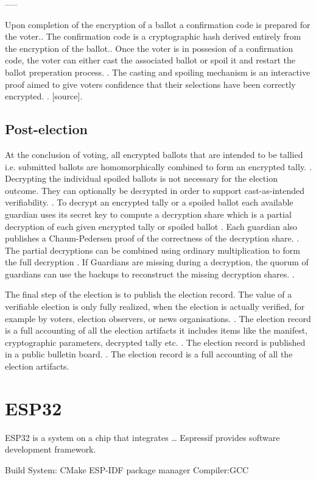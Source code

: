 -----

Upon completion of the encryption of a ballot a confirmation code is prepared for the voter.\cite[17]{eg-spec}. The confirmation code is a cryptographic hash derived entirely from the encryption of the ballot.\cite[14]{eg-paper}. Once the voter is in possesion of a confirmation code, the voter can either cast the associated ballot or spoil it and restart the ballot preperation process. \cite[17]{eg-spec}. The casting and spoiling mechanism is an interactive proof aimed to give voters confidence that their selections have been correctly encrypted. \cite{eg-docs}. [source].

\subsection{Post-election}
At the conclusion of voting, all encrypted ballots that are intended to be tallied i.e. submitted ballots are homomorphically combined to form an encrypted tally. \cite[5]{eg-spec} \cite[18]{eg-spec} \cite[15]{eg-paper}. Decrypting the individual spoiled ballots is not necessary for the election outcome. They can optionally be decrypted in order to support cast-as-intended verifiability. \cite[17]{eg-paper}. To decrypt an encrypted tally or a spoiled ballot each available guardian uses its secret key to compute a decryption share which is a partial decryption of each given encrypted tally or spoiled ballot \cite[18]{eg-spec} \cite[15]{eg-paper}. Each guardian also publishes a Chaum-Pedersen proof of the correctness of the decryption share. \cite[18]{eg-spec}. The partial decryptions can be combined using ordinary multiplication to form the full decryption \cite{eg-docs}. If Guardians are missing during a decryption, the quorum of guardians can use the backups to reconstruct the missing decryption shares. \cite{eg-docs}. 

The final step of the election is to publish the election record. The value of a verifiable election is only fully realized, when the election is actually verified, for example by voters, election observers, or news organisations. \cite[17]{eg-spec}. The election record is a full accounting of all the election artifacts it includes items like the manifest, cryptographic parameters, decrypted tally etc. \cite[24]{eg-spec}. The election record is published in a public bulletin board. \cite[17]{eg-spec}. The election record is a full accounting of all the election artifacts.


\section{ESP32}
ESP32 is a system on a chip that integrates \dots
Espressif provides software development framework.


Build System: CMake
ESP-IDF package manager
Compiler:GCC





